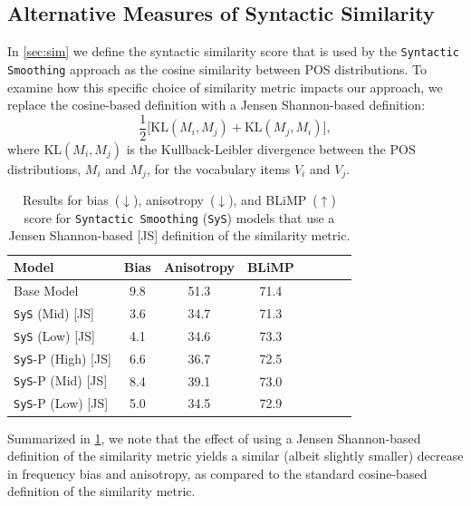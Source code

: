 \subsection{Alternative Measures of Syntactic Similarity}

In \cref{sec:sim} we define the syntactic similarity score that is used by the \texttt{Syntactic Smoothing} approach as the cosine similarity between POS distributions. To examine how this specific choice of similarity metric impacts our approach, we replace the cosine-based definition with a Jensen Shannon-based definition:
$$ \frac{1}{2}\big[ \text{KL}(M_i, M_j ) + \text{KL}(M_j, M_i)\big],$$
where KL$(M_i, M_j)$ is the Kullback-Leibler divergence between the POS distributions, $M_i$ and $M_j$, for the vocabulary items $V_i$ and $V_j$.

\begin{table}[ht!]
\centering
\small
\begin{tabular}{l||cc|ccccc}
\toprule
\textbf{Model}  &  \textbf{Bias}  & \textbf{Anisotropy} & \textbf{BLiMP} \\
\midrule
Base Model & 9.8 & 51.3 & 71.4  \\
\midrule
\texttt{SyS} (Mid) \hspace{0.42cm} [JS]  & 3.6 & 34.7 & 71.3 \\
\texttt{SyS} (Low) \hspace{0.38cm} [JS]  & 4.1 & 34.6 & 73.3  \\
\texttt{SyS}-P (High) \hspace{0.05cm} [JS] & 6.6 & 36.7  & 72.5  \\ 
\texttt{SyS}-P (Mid) \hspace{0.15cm} [JS] & 8.4 & 39.1 &  73.0 \\ 
\texttt{SyS}-P (Low) \hspace{0.12cm} [JS] & 5.0 &  34.5 & 72.9 \\ 
\bottomrule
\end{tabular}
\caption{\label{tbl:jsd-similarity-metric-results}
Results for bias~($\downarrow$), anisotropy~($\downarrow$), and BLiMP~($\uparrow$) score for \texttt{Syntactic Smoothing} (\texttt{SyS}) models that use a Jensen Shannon-based [JS] definition of the similarity metric.}
\end{table}

Summarized in \cref{tbl:jsd-similarity-metric-results}, we note that the effect of using a Jensen Shannon-based definition of the similarity metric yields a similar (albeit slightly smaller) decrease in frequency bias and anisotropy, as compared to the standard cosine-based definition of the similarity metric.   

